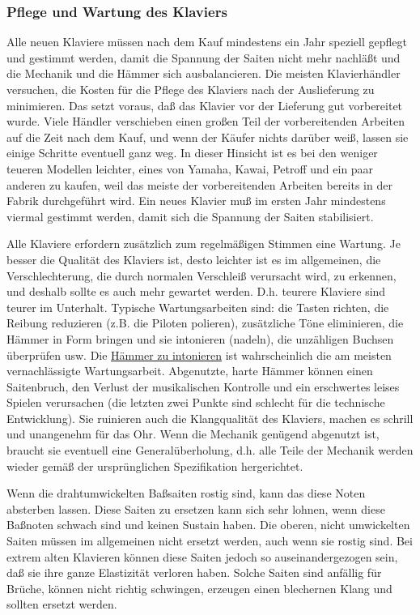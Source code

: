 \subsubsection{Pflege und Wartung des Klaviers}
\label{c1iii17f}

Alle neuen Klaviere müssen nach dem Kauf mindestens ein Jahr speziell gepflegt und gestimmt werden, damit die Spannung der Saiten nicht mehr nachläßt und die Mechanik und die Hämmer sich ausbalancieren.
Die meisten Klavierhändler versuchen, die Kosten für die Pflege des Klaviers nach der Auslieferung zu minimieren.
Das setzt voraus, daß das Klavier vor der Lieferung gut vorbereitet wurde.
Viele Händler verschieben einen großen Teil der vorbereitenden Arbeiten auf die Zeit nach dem Kauf, und wenn der Käufer nichts darüber weiß, lassen sie einige Schritte eventuell ganz weg.
In dieser Hinsicht ist es bei den weniger teueren Modellen leichter, eines von Yamaha, Kawai, Petroff und ein paar anderen zu kaufen, weil das meiste der vorbereitenden Arbeiten bereits in der Fabrik durchgeführt wird.
Ein neues Klavier muß im ersten Jahr mindestens viermal gestimmt werden, damit sich die Spannung der Saiten stabilisiert.

Alle Klaviere erfordern zusätzlich zum regelmäßigen Stimmen eine Wartung.
Je besser die Qualität des Klaviers ist, desto leichter ist es im allgemeinen, die Verschlechterung, die durch normalen Verschleiß verursacht wird, zu erkennen, und deshalb sollte es auch mehr gewartet werden.
D.h. teurere Klaviere sind teurer im Unterhalt.
Typische Wartungsarbeiten sind: die Tasten richten, die Reibung reduzieren (z.B. die Piloten polieren), zusätzliche Töne eliminieren, die Hämmer in Form bringen und sie intonieren (nadeln), die unzähligen Buchsen überprüfen usw.
Die \hyperref[c2_7_hamm]{Hämmer zu intonieren} ist wahrscheinlich die am meisten vernachlässigte Wartungsarbeit.
Abgenutzte, harte Hämmer können einen Saitenbruch, den Verlust der musikalischen Kontrolle und ein erschwertes leises Spielen verursachen (die letzten zwei Punkte sind schlecht für die technische Entwicklung).
Sie ruinieren auch die Klangqualität des Klaviers, machen es schrill und unangenehm für das Ohr.
Wenn die Mechanik genügend abgenutzt ist, braucht sie eventuell eine Generalüberholung, d.h. alle Teile der Mechanik werden wieder gemäß der ursprünglichen Spezifikation hergerichtet.

Wenn die drahtumwickelten Baßsaiten rostig sind, kann das diese Noten absterben lassen.
Diese Saiten zu ersetzen kann sich sehr lohnen, wenn diese Baßnoten schwach sind und keinen Sustain haben.
Die oberen, nicht umwickelten Saiten müssen im allgemeinen nicht ersetzt werden, auch wenn sie rostig sind.
Bei extrem alten Klavieren können diese Saiten jedoch so auseinandergezogen sein, daß sie ihre ganze Elastizität verloren haben.
Solche Saiten sind anfällig für Brüche, können nicht richtig schwingen, erzeugen einen blechernen Klang und sollten ersetzt werden.

